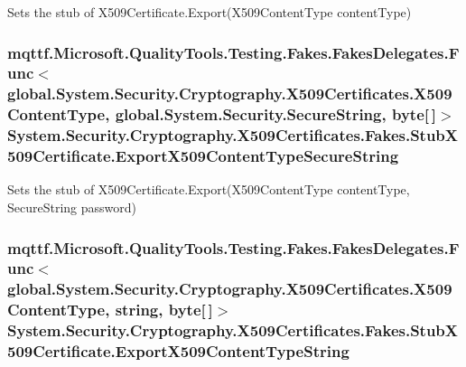 Sets the stub of X509\-Certificate.\-Export(\-X509\-Content\-Type content\-Type)

\hypertarget{class_system_1_1_security_1_1_cryptography_1_1_x509_certificates_1_1_fakes_1_1_stub_x509_certificate_ad051779e5b9eacc3920bf3e26e522274}{
\subsubsection[{Export\-X509\-Content\-Type\-Secure\-String}]{\setlength{\rightskip}{0pt plus 5cm}mqttf.\-Microsoft.\-Quality\-Tools.\-Testing.\-Fakes.\-Fakes\-Delegates.\-Func$<$global.\-System.\-Security.\-Cryptography.\-X509\-Certificates.\-X509\-Content\-Type, global.\-System.\-Security.\-Secure\-String, byte\mbox{[}$\,$\mbox{]}$>$ System.\-Security.\-Cryptography.\-X509\-Certificates.\-Fakes.\-Stub\-X509\-Certificate.\-Export\-X509\-Content\-Type\-Secure\-String}}\label{class_system_1_1_security_1_1_cryptography_1_1_x509_certificates_1_1_fakes_1_1_stub_x509_certificate_ad051779e5b9eacc3920bf3e26e522274}


Sets the stub of X509\-Certificate.\-Export(\-X509\-Content\-Type content\-Type, Secure\-String password)

\hypertarget{class_system_1_1_security_1_1_cryptography_1_1_x509_certificates_1_1_fakes_1_1_stub_x509_certificate_a6ec63eb05543a644dcfad346cf5be19a}{
\subsubsection[{Export\-X509\-Content\-Type\-String}]{\setlength{\rightskip}{0pt plus 5cm}mqttf.\-Microsoft.\-Quality\-Tools.\-Testing.\-Fakes.\-Fakes\-Delegates.\-Func$<$global.\-System.\-Security.\-Cryptography.\-X509\-Certificates.\-X509\-Content\-Type, string, byte\mbox{[}$\,$\mbox{]}$>$ System.\-Security.\-Cryptography.\-X509\-Certificates.\-Fakes.\-Stub\-X509\-Certificate.\-Export\-X509\-Content\-Type\-String}}\label{class_system_1_1_security_1_1_cryptography_1_1_x509_certificates_1_1_fakes_1_1_stub_x509_certificate_a6ec63eb05543a644dcfad346cf5be19a}


